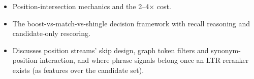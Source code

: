 \begin{interviewq}

\goodgreat
\begin{itemize}
    \item {} Position-intersection mechanics and the 2--4$\times$ cost.
    \item {} The boost-vs-match-vs-shingle decision framework with recall reasoning and candidate-only rescoring.
    \item {} Discusses position streams' skip design, graph token filters and synonym-position interaction, and where phrase signals belong once an LTR reranker exists (as features over the candidate set).
\end{itemize}

\end{interviewq}
